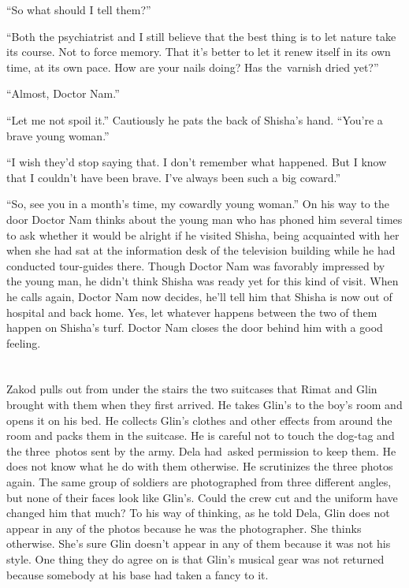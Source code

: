\documentclass[twoside,11pt]{book}
\begin{document}
``So what should I tell them?''

``Both the psychiatrist and I still believe that the best thing is to let nature take its course. Not to
force memory. That it's better to let it renew itself in its own time, at its own pace. How are your nails doing? Has
the~varnish dried yet?''

``Almost, Doctor Nam.''

``Let me not spoil it.'' Cautiously he pats the back of Shisha's hand. ``You're a
brave young woman.''

``I wish they'd stop saying that. I don't remember what happened. But I know that I couldn't have been
brave. I've always been such a big coward.''

``So, see you in a month's time, my cowardly young woman.'' On his way to the door Doctor
Nam thinks about the young man who has phoned him several times to ask whether it would be alright if he visited
Shisha, being acquainted with her when she had sat at the information desk of the television building while he had
conducted tour-guides there. Though Doctor Nam was favorably impressed by the young man, he didn't think Shisha was
ready yet for this kind of visit. When he calls again, Doctor Nam now decides, he'll tell him that Shisha is now out of
hospital and back home. Yes, let whatever happens between the two of them happen on Shisha's turf. Doctor Nam closes
the door behind him with a good feeling.


\bigskip

\chapter{}

Zakod pulls out from under the stairs the two suitcases that Rimat and Glin brought with them when they first arrived.
He takes Glin's to the boy's room and opens it on his bed. He collects Glin's clothes and other effects from around the
room and packs them in the suitcase. He is careful not to touch the dog-tag and the three~photos sent by the army. Dela
had~asked permission to keep them.
He does not know what he do with them otherwise.
He scrutinizes the three
photos again. The same group of soldiers are photographed from three different angles, but none of their faces look
like Glin's. Could the crew cut and the uniform have changed him that much?  To his way of thinking, as he told
Dela, Glin does not appear in any of the photos because he was the photographer. She thinks otherwise. She's sure Glin
doesn't appear in any of them because it was not his style.  One thing they do agree on is that Glin's musical gear
was not returned because somebody at his base had taken a fancy to it.
\end{document}

